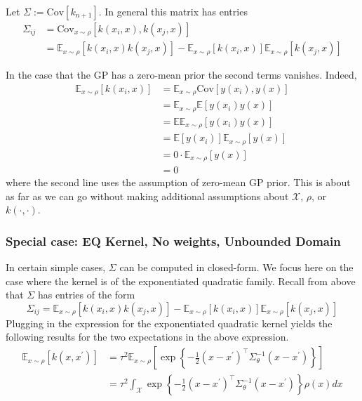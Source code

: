\documentclass[12pt]{article}
\begin{document}
Let $\Sigma := \text{Cov}\left[k_{n+1}\right]$. In general this matrix has entries 
\begin{align*}
\Sigma_{ij} &= \text{Cov}_{x \sim \rho}\left[k(x_i, x), k(x_j, x) \right] \\
            &= \mathbb{E}_{x \sim \rho}\left[k(x_i, x)k(x_j, x) \right] - \mathbb{E}_{x \sim \rho}\left[k(x_i, x)\right]\mathbb{E}_{x \sim \rho}\left[k(x_j, x) \right]
\end{align*}

In the case that the GP has a zero-mean prior the second terms vanishes. Indeed, 
\begin{align*}
\mathbb{E}_{x \sim \rho}\left[k(x_i, x)\right] &= \mathbb{E}_{x \sim \rho} \text{Cov}\left[y(x_i), y(x) \right] \\
                                               &= \mathbb{E}_{x \sim \rho} \mathbb{E}\left[y(x_i)y(x) \right] \\
                                               &= \mathbb{E} \mathbb{E}_{x \sim \rho} \left[y(x_i)y(x) \right] \\
                                               &= \mathbb{E}\left[y(x_i)\right] \mathbb{E}_{x \sim \rho} \left[y(x) \right] \\
                                               &= 0 \cdot \mathbb{E}_{x \sim \rho} \left[y(x) \right] \\
                                               &= 0
\end{align*}
where the second line uses the assumption of zero-mean GP prior. This is about as far as we can go without making additional assumptions 
about $\mathcal{X}$, $\rho$, or $k(\cdot, \cdot)$. 

\subsubsection{Special case: EQ Kernel, No weights, Unbounded Domain}
In certain simple cases, $\Sigma$ can be computed in closed-form. We focus here on the case where the kernel is of the exponentiated quadratic family. 
Recall from above that $\Sigma$ has entries of the form 
\[\Sigma_{ij} = \mathbb{E}_{x \sim \rho}\left[k(x_i, x)k(x_j, x) \right] - \mathbb{E}_{x \sim \rho}\left[k(x_i, x)\right]\mathbb{E}_{x \sim \rho}\left[k(x_j, x) \right]\]
Plugging in the expression for the exponentiated quadratic kernel yields the following results for the two expectations in the above expression. 
\begin{align*}
\mathbb{E}_{x \sim \rho}\left[k(x, x^\prime)\right] &= \tau^2 \mathbb{E}_{x \sim \rho}\left[\exp\left\{-\frac{1}{2}(x - x^\prime)^{\top}\Sigma_\theta^{-1}(x - x^\prime)\right\} \right] \\
&= \tau^2 \int_{\mathcal{X}} \exp\left\{-\frac{1}{2}(x - x^\prime)^{\top}\Sigma_\theta^{-1}(x - x^\prime)\right\} \rho(x) dx
\end{align*}
\end{document}
